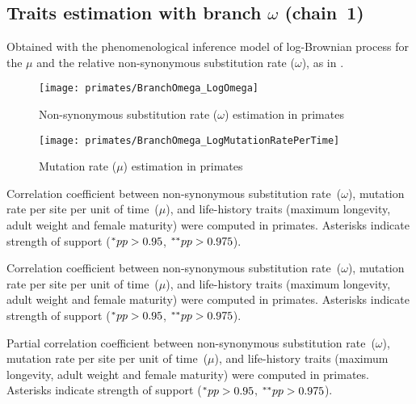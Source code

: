 \subsection{Traits estimation with branch \texorpdfstring{$\omega$}{ω} (chain~1)}
Obtained with the phenomenological inference model of log-Brownian process for the $\mu$ and the relative non-synonymous substitution rate ($\omega$), as in \citet{Lartillot2011}.

\begin{figure}[H]
    \centering
    \texttt{[image: primates/BranchOmega\_LogOmega]}
    \caption[$\omega$ estimation in primates]{{Non-synonymous substitution} rate ($\omega$) estimation in primates}
\end{figure}

\begin{figure}[H]
    \centering
    \texttt{[image: primates/BranchOmega\_LogMutationRatePerTime]}
    \caption[$\mu$ estimation in primates]{Mutation rate ($\mu$) estimation in primates}
\end{figure}

\begin{table}[H]
    
    \caption[Correlation coefficient matrix in primates ($\omega$)]{
    Correlation coefficient between non-synonymous substitution rate~($\omega$), mutation rate per site per unit of time~($\mu$), and life-history traits (maximum longevity, adult weight and female maturity) were computed in primates.
    Asterisks indicate strength of support ($\smash{^{*}} pp > 0.95$, $\smash{^{**}} pp > 0.975$).}
\end{table}

\begin{table}[H]
    
    \caption[Covariance matrix in primates ($\omega$)]{
    Correlation coefficient between non-synonymous substitution rate~($\omega$), mutation rate per site per unit of time~($\mu$), and life-history traits (maximum longevity, adult weight and female maturity) were computed in primates.
    Asterisks indicate strength of support ($\smash{^{*}} pp > 0.95$, $\smash{^{**}} pp > 0.975$).}
\end{table}

\begin{table}[H]
    
    \caption[Partial correlation coefficient matrix in primates ($\omega$)]{
    Partial correlation coefficient between non-synonymous substitution rate~($\omega$), mutation rate per site per unit of time~($\mu$), and life-history traits (maximum longevity, adult weight and female maturity) were computed in primates.
    Asterisks indicate strength of support ($\smash{^{*}} pp > 0.95$, $\smash{^{**}} pp > 0.975$).}
\end{table}


